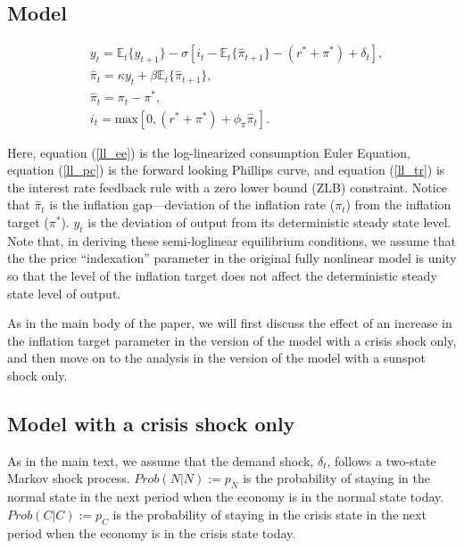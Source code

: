 \documentclass[11pt]{article}
\begin{document}
\begin{singlespace}
		\subsection{Model}
		
		\begin{align}
			& y_{t} = \mathbb{E}_t\{y_{t+1}\}  -\sigma \left[i_t - \mathbb{E}_t\{\hat{\pi}_{t+1}\} - (r^* + \pi^*) + \delta_t \right],\label{ll_ee}\\
			& \hat{\pi}_{t} = \kappa y_t + \beta\mathbb{E}_t\{\hat{\pi}_{t+1}\}\label{ll_pc},\\
			& \hat{\pi}_{t} = \pi_t - \pi^*,\\
			& i_t = \text{max}\left[0, (r^* + \pi^*) +  \phi_{\pi}\hat{\pi}_{t}\right].\label{ll_tr}
		\end{align}
		
		\noindent Here, equation (\ref{ll_ee}) is the log-linearized consumption Euler Equation, equation (\ref{ll_pc}) is the forward looking Phillips curve, and  equation (\ref{ll_tr}) is the interest rate feedback rule with a zero lower bound (ZLB) constraint. Notice that $\hat{\pi}_{t}$ is the inflation gap---deviation of the inflation rate ($\pi_{t}$) from the inflation target ($\pi^*$). $y_{t}$ is the deviation of output from its deterministic steady state level. Note that, in deriving these semi-loglinear equilibrium conditions, we assume that the the price ``indexation'' parameter in the original fully nonlinear model is unity so that the level of the inflation target does not affect the deterministic steady state level of output. 
		
		As in the main body of the paper, we will first discuss the effect of an increase in the inflation target parameter in the version of the model with a crisis shock only, and then move on to the analysis in the version of the model with a sunspot shock only. 
		
		\subsection{Model with a crisis shock only}
		
		As in the main text, we assume that the demand shock, $\delta_{t}$, follows a two-state Markov shock process. $Prob(N|N) := p_{N}$ is the probability of staying in the normal state in the next period when the economy is in the normal state today. $Prob(C|C) := p_C$ is the probability of staying in the crisis state in the next period when the economy is in the crisis state today. 
		

\end{singlespace}
\end{document}
